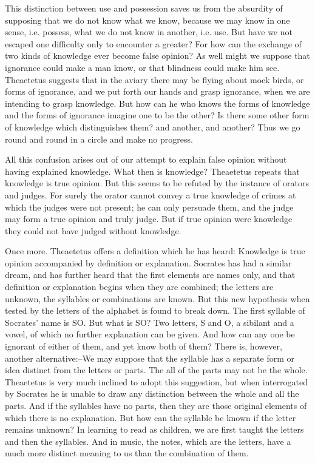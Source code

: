 This distinction between use and possession saves us from the absurdity
of supposing that we do not know what we know, because we may know in
one sense, i.e. possess, what we do not know in another, i.e. use. But
have we not escaped one difficulty only to encounter a greater? For how
can the exchange of two kinds of knowledge ever become false opinion?
As well might we suppose that ignorance could make a man know, or that
blindness could make him see. Theaetetus suggests that in the aviary
there may be flying about mock birds, or forms of ignorance, and we
put forth our hands and grasp ignorance, when we are intending to grasp
knowledge. But how can he who knows the forms of knowledge and the forms
of ignorance imagine one to be the other? Is there some other form of
knowledge which distinguishes them? and another, and another? Thus we go
round and round in a circle and make no progress.

All this confusion arises out of our attempt to explain false opinion
without having explained knowledge. What then is knowledge? Theaetetus
repeats that knowledge is true opinion. But this seems to be refuted by
the instance of orators and judges. For surely the orator cannot convey
a true knowledge of crimes at which the judges were not present; he
can only persuade them, and the judge may form a true opinion and truly
judge. But if true opinion were knowledge they could not have judged
without knowledge.

Once more. Theaetetus offers a definition which he has heard: Knowledge
is true opinion accompanied by definition or explanation. Socrates has
had a similar dream, and has further heard that the first elements are
names only, and that definition or explanation begins when they are
combined; the letters are unknown, the syllables or combinations
are known. But this new hypothesis when tested by the letters of the
alphabet is found to break down. The first syllable of Socrates' name
is SO. But what is SO? Two letters, S and O, a sibilant and a vowel,
of which no further explanation can be given. And how can any one
be ignorant of either of them, and yet know both of them? There is,
however, another alternative:--We may suppose that the syllable has a
separate form or idea distinct from the letters or parts. The all of the
parts may not be the whole. Theaetetus is very much inclined to adopt
this suggestion, but when interrogated by Socrates he is unable to
draw any distinction between the whole and all the parts. And if the
syllables have no parts, then they are those original elements of which
there is no explanation. But how can the syllable be known if the letter
remains unknown? In learning to read as children, we are first taught
the letters and then the syllables. And in music, the notes, which
are the letters, have a much more distinct meaning to us than the
combination of them.

